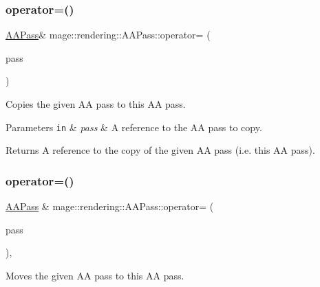 \subsubsection{\texorpdfstring{operator=()}{operator=()}\hspace{0.1cm}{\footnotesize\ttfamily [1/2]}}
{\footnotesize\ttfamily \mbox{\hyperlink{classmage_1_1rendering_1_1_a_a_pass}{A\+A\+Pass}}\& mage\+::rendering\+::\+A\+A\+Pass\+::operator= (\begin{DoxyParamCaption}\item[{const \mbox{\hyperlink{classmage_1_1rendering_1_1_a_a_pass}{A\+A\+Pass}} \&}]{pass }\end{DoxyParamCaption})\hspace{0.3cm}{\ttfamily [delete]}}

Copies the given AA pass to this AA pass.


\begin{DoxyParams}[1]{Parameters}
\mbox{\tt in}  & {\em pass} & A reference to the AA pass to copy. \\
\hline
\end{DoxyParams}
\begin{DoxyReturn}{Returns}
A reference to the copy of the given AA pass (i.\+e. this AA pass). 
\end{DoxyReturn}
\mbox{\label{classmage_1_1rendering_1_1_a_a_pass_a49e56b2a51acc9c99be91960a846f155}} 
\subsubsection{\texorpdfstring{operator=()}{operator=()}\hspace{0.1cm}{\footnotesize\ttfamily [2/2]}}
{\footnotesize\ttfamily \mbox{\hyperlink{classmage_1_1rendering_1_1_a_a_pass}{A\+A\+Pass}} \& mage\+::rendering\+::\+A\+A\+Pass\+::operator= (\begin{DoxyParamCaption}\item[{\mbox{\hyperlink{classmage_1_1rendering_1_1_a_a_pass}{A\+A\+Pass}} \&\&}]{pass }\end{DoxyParamCaption})\hspace{0.3cm}{\ttfamily [default]}, {\ttfamily [noexcept]}}

Moves the given AA pass to this AA pass.


